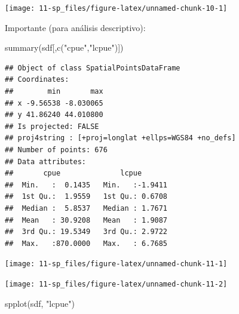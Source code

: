 \documentclass[
  spanish,
]{book}
\newenvironment{Shaded}{\begin{snugshade}}{\end{snugshade}}
\newcommand{\FunctionTok}[1]{\textcolor[rgb]{0.00,0.00,0.00}{#1}}
\newcommand{\NormalTok}[1]{#1}
\newcommand{\SpecialCharTok}[1]{\textcolor[rgb]{0.00,0.00,0.00}{#1}}
\newcommand{\StringTok}[1]{\textcolor[rgb]{0.31,0.60,0.02}{#1}}
\theoremstyle{break}
\begin{document}
\begin{center}\texttt{[image: 11-sp\_files/figure-latex/unnamed-chunk-10-1]} \end{center}

Importante (para análisis descriptivo):

\begin{Shaded}
\begin{Highlighting}[]
\FunctionTok{summary}\NormalTok{(sdf[,}\FunctionTok{c}\NormalTok{(}\StringTok{"cpue"}\NormalTok{,}\StringTok{"lcpue"}\NormalTok{)])}
\end{Highlighting}
\end{Shaded}

\begin{verbatim}
## Object of class SpatialPointsDataFrame
## Coordinates:
##        min       max
## x -9.56538 -8.030065
## y 41.86240 44.010800
## Is projected: FALSE 
## proj4string : [+proj=longlat +ellps=WGS84 +no_defs]
## Number of points: 676
## Data attributes:
##       cpue              lcpue        
##  Min.   :  0.1435   Min.   :-1.9411  
##  1st Qu.:  1.9559   1st Qu.: 0.6708  
##  Median :  5.8537   Median : 1.7671  
##  Mean   : 30.9208   Mean   : 1.9087  
##  3rd Qu.: 19.5349   3rd Qu.: 2.9722  
##  Max.   :870.0000   Max.   : 6.7685
\end{verbatim}

\begin{Shaded}
\end{Shaded}

\begin{center}\texttt{[image: 11-sp\_files/figure-latex/unnamed-chunk-11-1]} \end{center}

\begin{Shaded}
\end{Shaded}

\begin{center}\texttt{[image: 11-sp\_files/figure-latex/unnamed-chunk-11-2]} \end{center}

\begin{Shaded}
\begin{Highlighting}[]
\FunctionTok{spplot}\NormalTok{(sdf, }\StringTok{"lcpue"}\NormalTok{)}
\end{Highlighting}
\end{Shaded}
\end{document}
